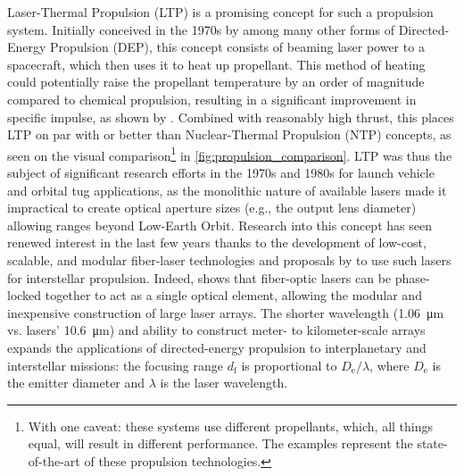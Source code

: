     Laser-Thermal Propulsion (LTP) is a promising concept for such a propulsion system. Initially conceived in the 1970s by \textcite{kantrowitzRelevanceSpace1971} among many other forms of Directed-Energy Propulsion (DEP), this concept consists of beaming laser power to a spacecraft, which then uses it to heat up propellant. This method of heating could potentially raise the propellant temperature by an order of magnitude compared to chemical propulsion, resulting in a significant improvement in specific impulse, as shown by \textcite{noredApplicationHighPower1976}. Combined with reasonably high thrust, this places LTP on par with or better than Nuclear-Thermal Propulsion (NTP) concepts, as seen on the visual comparison\footnote{With one caveat: these systems use different propellants, which, all things equal, will result in different performance. The examples represent the state-of-the-art of these propulsion technologies.} in \autoref{fig:propulsion_comparison}. LTP was thus the subject of significant research efforts in the 1970s and 1980s for launch vehicle and orbital tug applications, as the monolithic nature of available  lasers made it impractical to create optical aperture sizes (e.g., the output lens diameter) allowing ranges beyond Low-Earth Orbit. Research into this concept has seen renewed interest in the last few years thanks to the development of low-cost, scalable, and modular fiber-laser technologies and proposals by \textcite{lubinRoadmapInterstellarFlight2016a} to use such lasers for interstellar propulsion. Indeed, \citeauthor{lubinRoadmapInterstellarFlight2016a} shows that fiber-optic lasers can be phase-locked together to act as a single optical element, allowing the modular and inexpensive construction of large laser arrays. The shorter wavelength (\qty{1.06}{\um} vs.  lasers' \qty{10.6}{\um}) and ability to construct meter- to kilometer-scale arrays expands the applications of directed-energy propulsion to interplanetary and interstellar missions: the focusing range $d_\mathrm{f}$ is proportional to $D_\mathrm{e}/\lambda$, where $D_\mathrm{e}$ is the emitter diameter and $\lambda$ is the laser wavelength.

